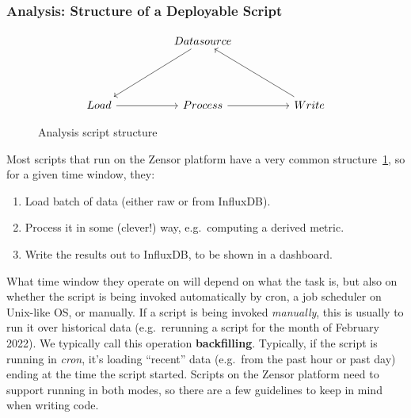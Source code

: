 \subsubsection{Analysis: Structure of a Deployable Script}\label{subsection:script_structure}


\begin{figure}
	\[\begin{tikzcd}
		&& Datasource \\
		&& {} \\
		Load && Process && Write
		\arrow[from=3-1, to=3-3]
		\arrow[from=3-3, to=3-5]
		\arrow[from=1-3, to=3-1]
		\arrow[from=3-5, to=1-3]
	\end{tikzcd}\]
	\caption{Analysis script structure}
	\label{tik:analysis_script}
\end{figure}

Most scripts that run on the Zensor platform have a very common structure~\ref{tik:analysis_script}, so for a given time window, they:
\begin{enumerate}
	\item Load batch of data (either raw or from InfluxDB).
	\item Process it in some (clever!) way, e.g.\ computing a derived metric.
	\item Write the results out to InfluxDB, to be shown in a dashboard.
\end{enumerate}
What time window they operate on will depend on what the task is, but also on whether the script is being invoked automatically by cron, a job scheduler on Unix-like OS, or manually.
If a script is being invoked \textit{manually}, this is usually to run it over historical data (e.g.\ rerunning a script for the month of February 2022). We typically call this operation \textbf{backfilling}.
Typically, if the script is running in \textit{cron}, it's loading ``recent'' data (e.g.\ from the past hour or past day) ending at the time the script started.
Scripts on the Zensor platform need to support running in both modes, so there are a few guidelines to keep in mind when writing code.

